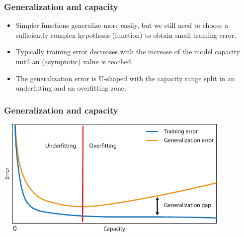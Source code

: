 \documentclass[notes]{beamer}          %
\newif\iffull
\begin{document}
\iffull
\begin{frame}
\frametitle{Overfitting and underfitting in polynomial estimation}
    \begin{itemize}
        \item Models with low capacity are not up to the task.
        \item Models with high-capacity can solve a complex task, but when the capacity is too high for the concrete (training) task there is the danger of overfitting.
        \item In our example: the linear function is unable to capture the curvature so it undefits.
        \item The degree-12 predictor is capable of fitting the training data, but it also able to find infinitely many functions that pass through the same points, so it has high probability of overfitting.
        \item The degree-4 function is the right solution and it generalizes well on the new data.
    \end{itemize}
\end{frame}
\fi

\begin{frame}
\frametitle{Generalization and capacity}
    \begin{itemize}
        \item Simpler functions generalize more easily, but we still need to choose a sufficiently complex hypothesis (function) to obtain small training error.
        \item Typically training error decreases with the increase of the model capacity until an (asymptotic) value is reached.
        \item The generalization error is U-shaped with the capacity range split in an underfitting and an overfitting zone\iffull (see next slide)\fi.
    \end{itemize}
\end{frame}


\begin{frame}
\frametitle{Generalization and capacity}
    \begin{center}
        \includegraphics[width=0.85\textwidth]{../figures/week_1/generalization_gap.pdf}
    \end{center}
\end{frame}
\end{document}
